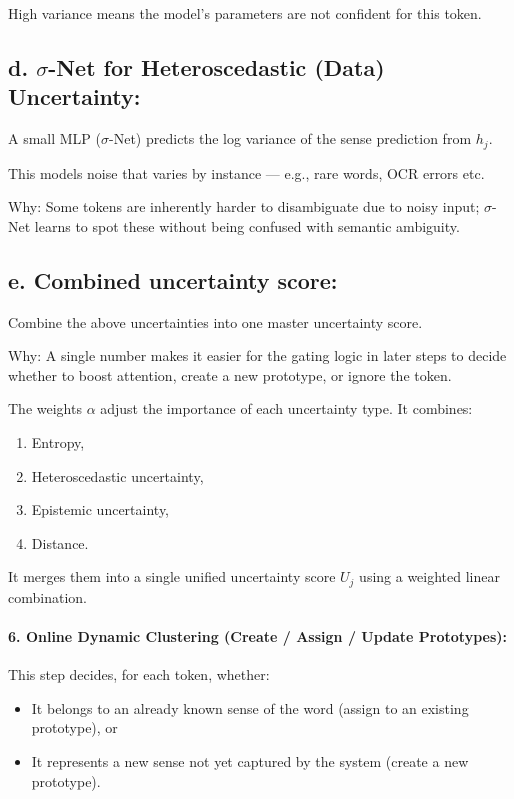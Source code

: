 \documentclass[a4paper,12pt]{article}
\begin{document}
High variance means the model’s parameters are not confident for this token.

\subsection*{d. $\sigma$-Net for Heteroscedastic (Data) Uncertainty:}
A small MLP ($\sigma$-Net) predicts the log variance of the sense prediction from $h_j$.

This models noise that varies by instance --- e.g., rare words, OCR errors etc.

Why: Some tokens are inherently harder to disambiguate due to noisy input; $\sigma$-Net learns to spot these without being confused with semantic ambiguity.

\subsection*{e. Combined uncertainty score:}
Combine the above uncertainties into one master uncertainty score.

Why: A single number makes it easier for the gating logic in later steps to decide whether to boost attention, create a new prototype, or ignore the token.

The weights $\alpha$ adjust the importance of each uncertainty type. It combines:
\begin{enumerate}
    \item Entropy,
    \item Heteroscedastic uncertainty,
    \item Epistemic uncertainty,
    \item Distance.
\end{enumerate}
It merges them into a single unified uncertainty score $U_j$ using a weighted linear combination.

\paragraph{6. Online Dynamic Clustering (Create / Assign / Update Prototypes):}
This step decides, for each token, whether:
\begin{itemize}
    \item It belongs to an already known sense of the word (assign to an existing prototype), or
    \item It represents a new sense not yet captured by the system (create a new prototype).
\end{itemize}
\end{document}
